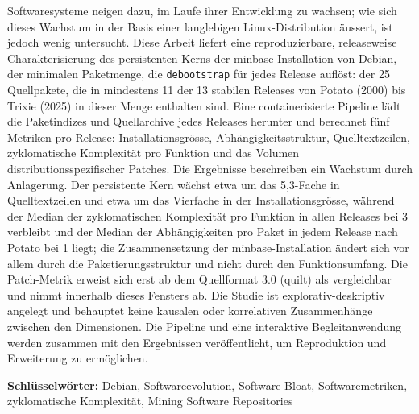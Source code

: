 Softwaresysteme neigen dazu, im Laufe ihrer Entwicklung zu wachsen; wie sich dieses Wachstum in der Basis einer langlebigen Linux-Distribution äussert, ist jedoch wenig untersucht. Diese Arbeit liefert eine reproduzierbare, releaseweise Charakterisierung des persistenten Kerns der minbase-Installation von Debian, der minimalen Paketmenge, die \texttt{debootstrap} für jedes Release auflöst: der 25 Quellpakete, die in mindestens 11 der 13 stabilen Releases von Potato (2000) bis Trixie (2025) in dieser Menge enthalten sind. Eine containerisierte Pipeline lädt die Paketindizes und Quellarchive jedes Releases herunter und berechnet fünf Metriken pro Release: Installationsgrösse, Abhängigkeitsstruktur, Quelltextzeilen, zyklomatische Komplexität pro Funktion und das Volumen distributionsspezifischer Patches. Die Ergebnisse beschreiben ein Wachstum durch Anlagerung. Der persistente Kern wächst etwa um das 5,3-Fache in Quelltextzeilen und etwa um das Vierfache in der Installationsgrösse, während der Median der zyklomatischen Komplexität pro Funktion in allen Releases bei 3 verbleibt und der Median der Abhängigkeiten pro Paket in jedem Release nach Potato bei 1 liegt; die Zusammensetzung der minbase-Installation ändert sich vor allem durch die Paketierungsstruktur und nicht durch den Funktionsumfang. Die Patch-Metrik erweist sich erst ab dem Quellformat 3.0 (quilt) als vergleichbar und nimmt innerhalb dieses Fensters ab. Die Studie ist explorativ-deskriptiv angelegt und behauptet keine kausalen oder korrelativen Zusammenhänge zwischen den Dimensionen. Die Pipeline und eine interaktive Begleitanwendung werden zusammen mit den Ergebnissen veröffentlicht, um Reproduktion und Erweiterung zu ermöglichen.

\vspace{6em} 

\noindent\textbf{Schlüsselwörter:} Debian, Softwareevolution, Software-Bloat, Softwaremetriken, zyklomatische Komplexität, Mining Software Repositories
